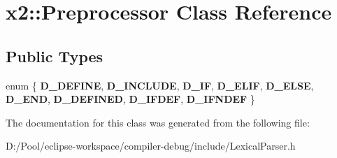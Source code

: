 \hypertarget{classx2_1_1_preprocessor}{}\section{x2\+:\+:Preprocessor Class Reference}
\label{classx2_1_1_preprocessor}
\subsection*{Public Types}
\begin{DoxyCompactItemize}
\item 
\mbox{\label{classx2_1_1_preprocessor_ab229db46480489d78dde6b24513f5d4f}} 
enum \{ \newline
{\bfseries D\+\_\+\+D\+E\+F\+I\+NE}, 
{\bfseries D\+\_\+\+I\+N\+C\+L\+U\+DE}, 
{\bfseries D\+\_\+\+IF}, 
{\bfseries D\+\_\+\+E\+L\+IF}, 
\newline
{\bfseries D\+\_\+\+E\+L\+SE}, 
{\bfseries D\+\_\+\+E\+ND}, 
{\bfseries D\+\_\+\+D\+E\+F\+I\+N\+ED}, 
{\bfseries D\+\_\+\+I\+F\+D\+EF}, 
\newline
{\bfseries D\+\_\+\+I\+F\+N\+D\+EF}
 \}
\end{DoxyCompactItemize}


The documentation for this class was generated from the following file\+:\begin{DoxyCompactItemize}
\item 
D\+:/\+Pool/eclipse-\/workspace/compiler-\/debug/include/Lexical\+Parser.\+h\end{DoxyCompactItemize}
